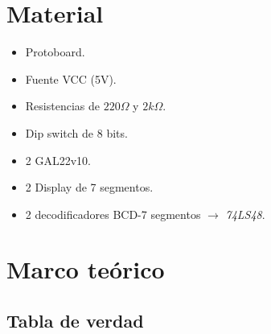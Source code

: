 \documentclass[12pt, oneside, openany]{article}
\begin{document}
\section{Material}
{\sffamily\large
    \renewcommand{\labelitemi}{$\bullet$}
    \begin{itemize}
        \item Protoboard.
        \item Fuente VCC (5V).
        \item Resistencias de $220\Omega$ y $2k\Omega$.
        \item Dip switch de 8 bits.
        \item 2 GAL22v10.
        \item 2 Display de 7 segmentos.
        \item 2 decodificadores BCD-7 segmentos $\to$ \emph{74LS48}.
    \end{itemize}
}

\newpage
\section{Marco teórico}
\subsection{Tabla de verdad}
\end{document}
